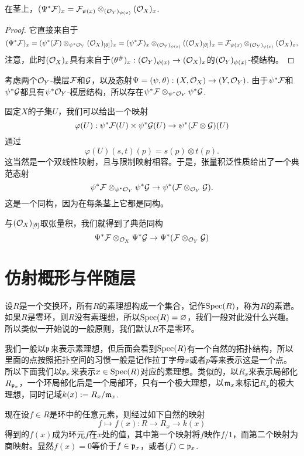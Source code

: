 \begin{pro}
在茎上，$(\Psi^*\mathcal{F})_x=\mathcal{F}_{\psi(x)}\otimes_{(\mathcal{O}_Y)_{\psi(x)}} (\mathcal{O}_X)_{x}$.
\end{pro}

\begin{proof}
它直接来自于
\[
	(\Psi^*\mathcal{F})_x=(\psi^*(\mathcal{F})\otimes_{\psi^*\mathcal{O}_Y} (\mathcal{O}_X)_{[\theta]})_x=(\psi^*\mathcal{F})_x\otimes_{(\mathcal{O}_Y)_{\psi(x)}}((\mathcal{O}_X)_{[\theta]})_x=\mathcal{F}_{\psi(x)}\otimes_{(\mathcal{O}_Y)_{\psi(x)}}(\mathcal{O}_X)_x,
\]
注意，此时$(\mathcal{O}_X)_x$具有来自于$(\theta^\#)_x:(\mathcal{O}_Y)_{\psi(x)}\to (\mathcal{O}_X)_x$的$(\mathcal{O}_Y)_{\psi(x)}$-模结构。
\end{proof}

\begin{para}[张量积的逆像]
考虑两个$\mathcal{O}_Y$-模层$\mathcal{F}$和$\mathcal{G}$，以及态射$\Psi=(\psi,\theta):(X,\mathcal{O}_X)\to (Y,\mathcal{O}_Y)$. 由于$\psi^*\mathcal{F}$和$\psi^*\mathcal{G}$都具有$\psi^*\mathcal{O}_Y$-模层结构，所以存在$\psi^*\mathcal{F}\otimes_{\psi^*\mathcal{O}_Y}\psi^*\mathcal{G}$.

固定$X$的子集$U$，我们可以给出一个映射
\[
	\varphi(U):\psi^*\mathcal{F}(U)\times \psi^*\mathcal{G}(U) \to \psi^*(\mathcal{F}\otimes \mathcal{G})(U)
\]
通过
\[
	\varphi(U)(s,t)(p)=s(p)\otimes t(p).
\]
这当然是一个双线性映射，且与限制映射相容。于是，张量积泛性质给出了一个典范态射
\[
	\psi^*\mathcal{F}\otimes_{\psi^*\mathcal{O}_Y} \psi^*\mathcal{G} \to \psi^*(\mathcal{F}\otimes_{\mathcal{O}_Y} \mathcal{G}).
\]
这是一个同构，因为在每条茎上它都是同构。

与$(\mathcal{O}_X)_{[\theta]}$取张量积，我们就得到了典范同构
\[
	\Psi^*\mathcal{F}\otimes_{\mathcal{O}_X} \Psi^*\mathcal{G} \to \Psi^*(\mathcal{F}\otimes_{\mathcal{O}_Y} \mathcal{G})
\]
\end{para}

\section{仿射概形与伴随层}

\para 设$R$是一个交换环，所有$R$的素理想构成一个集合，记作$\operatorname{Spec}(R)$，称为$R$的素谱。如果$R$是零环，则$R$没有素理想，所以$\operatorname{Spec}(R)=\varnothing$，我们一般对此没什么兴趣。所以类似一开始说的一般原则，我们默认$R$不是零环。

我们一般以$\mathfrak{p}$来表示素理想，但后面会看到$\operatorname{Spec}(R)$有一个自然的拓扑结构，所以里面的点按照拓扑空间的习惯一般是记作拉丁字母$x$或者$p$等来表示这是一个点。所以下面我们以$\mathfrak{p}_x$来表示$x\in \operatorname{Spec}(R)$对应的素理想。类似的，以$R_x$来表示局部化$R_{\mathfrak{p}_x}$，一个环局部化后是一个局部环，只有一个极大理想，以$\mathfrak{m}_x$来标记$R_x$的极大理想，同时记域$k(x):=R_x/\mathfrak{m}_x$.

\para 现在设$f\in R$是环中的任意元素，则经过如下自然的映射
\[
	f\mapsto f(x):R\to R_x\to k(x)
\]
得到的$f(x)$成为环元$f$在$x$处的值，其中第一个映射将$f$映作$f/1$，而第二个映射为商映射。显然$f(x)=0$等价于$f\in \mathfrak{p}_x$，或者$(f)\subset \mathfrak{p}_x$.

